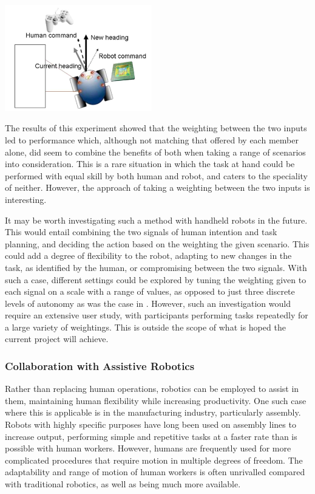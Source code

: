 \documentclass[11pt]{article}
\begin{document}
\begin{center}
\includegraphics[width=0.48\textwidth]{autocar.png}
\label{figure:autocar}
\end{center}

The results of this experiment showed that the weighting between the two inputs led to performance which, although not matching that offered by each member alone, did seem to combine the benefits of both when taking a range of scenarios into consideration. This is a rare situation in which the task at hand could be performed with equal skill by both human and robot, and caters to the speciality of neither. However, the approach of taking a weighting between the two inputs is interesting. 

It may be worth investigating such a method with handheld robots in the future. This would entail combining the two signals of human intention and task planning, and deciding the action based on the weighting the given scenario. This could add a degree of flexibility to the robot, adapting to new changes in the task, as identified by the human, or compromising between the two signals. With such a case, different settings could be explored by tuning the weighting given to each signal on a scale with a range of values, as opposed to just three discrete levels of autonomy as was the case in \cite{GreggSmithDesign}. However, such an investigation would require an extensive user study, with participants performing tasks repeatedly for a large variety of weightings. This is outside the scope of what is hoped the current project will achieve.

\subsubsection{Collaboration with Assistive Robotics}
Rather than replacing human operations, robotics can be employed to assist in them, maintaining human flexibility while increasing productivity. One such case where this is applicable is in the manufacturing industry, particularly assembly. Robots with highly specific purposes have long been used on assembly lines to increase output, performing simple and repetitive tasks at a faster rate than is possible with human workers. However, humans are frequently used for more complicated procedures that require motion in multiple degrees of freedom. The adaptability and range of motion of human workers is often unrivalled compared with traditional robotics, as well as being much more available. 
\end{document}
